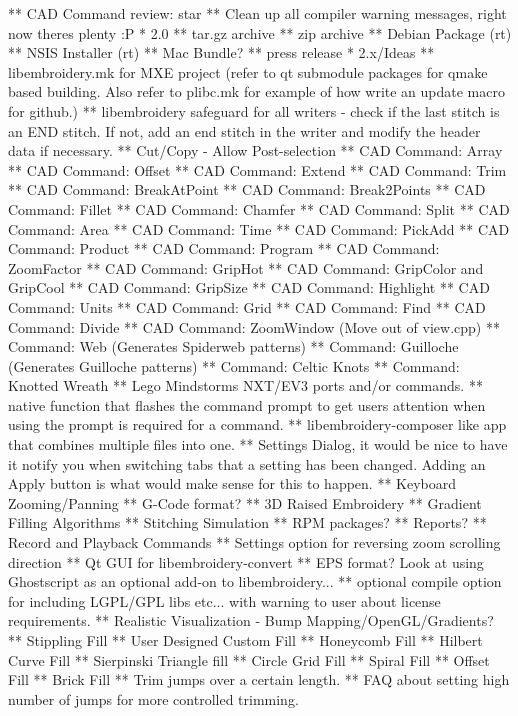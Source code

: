 \begin{itemize}
** CAD Command review: star
** Clean up all compiler warning messages, right now theres plenty :P
* 2.0
** tar.gz archive
** zip archive
** Debian Package (rt)
** NSIS Installer (rt)
** Mac Bundle?
** press release
* 2.x/Ideas
** libembroidery.mk for MXE project (refer to qt submodule packages for qmake based building. Also refer to plibc.mk for example of how write an update macro for github.)
** libembroidery safeguard for all writers - check if the last stitch is an END stitch. If not, add an end stitch in the writer and modify the header data if necessary.
** Cut/Copy - Allow Post-selection
** CAD Command: Array
** CAD Command: Offset
** CAD Command: Extend
** CAD Command: Trim
** CAD Command: BreakAtPoint
** CAD Command: Break2Points
** CAD Command: Fillet
** CAD Command: Chamfer
** CAD Command: Split
** CAD Command: Area
** CAD Command: Time
** CAD Command: PickAdd
** CAD Command: Product
** CAD Command: Program
** CAD Command: ZoomFactor
** CAD Command: GripHot
** CAD Command: GripColor and GripCool
** CAD Command: GripSize
** CAD Command: Highlight
** CAD Command: Units
** CAD Command: Grid
** CAD Command: Find
** CAD Command: Divide
** CAD Command: ZoomWindow (Move out of view.cpp)
** Command: Web (Generates Spiderweb patterns)
** Command: Guilloche (Generates Guilloche patterns)
** Command: Celtic Knots
** Command: Knotted Wreath
** Lego Mindstorms NXT/EV3 ports and/or commands.
** native function that flashes the command prompt to get users attention when using the prompt is required for a command.
** libembroidery-composer like app that combines multiple files into one.
** Settings Dialog, it would be nice to have it notify you when switching tabs that a setting has been changed. Adding an Apply button is what would make sense for this to happen.
** Keyboard Zooming/Panning
** G-Code format?
** 3D Raised Embroidery
** Gradient Filling Algorithms
** Stitching Simulation
** RPM packages?
** Reports?
** Record and Playback Commands
** Settings option for reversing zoom scrolling direction
** Qt GUI for libembroidery-convert
** EPS format? Look at using Ghostscript as an optional add-on to libembroidery...
** optional compile option for including LGPL/GPL libs etc... with warning to user about license requirements.
** Realistic Visualization - Bump Mapping/OpenGL/Gradients?
** Stippling Fill
** User Designed Custom Fill
** Honeycomb Fill
** Hilbert Curve Fill
** Sierpinski Triangle fill
** Circle Grid Fill
** Spiral Fill
** Offset Fill
** Brick Fill
** Trim jumps over a certain length.
** FAQ about setting high number of jumps for more controlled trimming.

\end{itemize}
